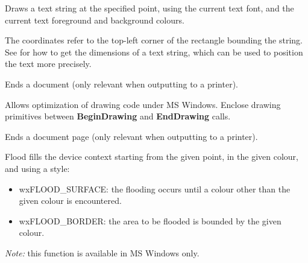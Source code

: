 
\label{wxdcdrawtext}


Draws a text string at the specified point, using the current text font,
and the current text foreground and background colours.

The coordinates refer to the top-left corner of the rectangle bounding
the string. See  for how
to get the dimensions of a text string, which can be used to position the
text more precisely.

\label{wxdcenddoc}


Ends a document (only relevant when outputting to a printer).

\label{wxdcenddrawing}


Allows optimization of drawing code under MS Windows. Enclose
drawing primitives between {\bf BeginDrawing} and {\bf EndDrawing}\rtfsp
calls.

\label{wxdcendpage}


Ends a document page (only relevant when outputting to a printer).

\label{wxdcfloodfill}


Flood fills the device context starting from the given point, in the given colour,
and using a style:

\begin{itemize}\itemsep=0pt
\item wxFLOOD\_SURFACE: the flooding occurs until a colour other than the given colour is encountered.
\item wxFLOOD\_BORDER: the area to be flooded is bounded by the given colour.
\end{itemize}

{\it Note:} this function is available in MS Windows only.

